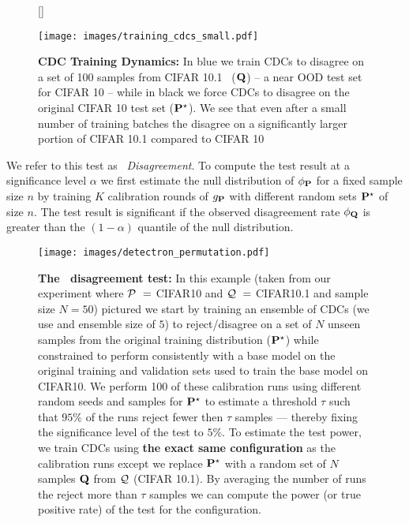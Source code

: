 \begin{figure}[!htb]
    [\FBwidth]
    {\caption{\footnotesize \textbf{CDC Training Dynamics:} In blue we train CDCs to disagree on a set of 100 samples from CIFAR 10.1~\citep{cifar101} ($\mathbf{Q}$) -- a near OOD test set for CIFAR 10 -- while in black
    we force CDCs to disagree on the original CIFAR 10 test set ($\mathbf{P}^\star$).
    We see that even after a small number of training batches the disagree on a significantly larger portion of CIFAR 10.1 compared to CIFAR 10}
    \label{fig:harmfulshift}}
    {\texttt{[image: images/training\_cdcs\_small.pdf]}}
\end{figure}

\noindent
We refer to this test as \textit{\method\ Disagreement}.
To compute the test result at a significance level $\alpha$ we first estimate the null distribution of $\phi_{\mathbf{P}}$ for a fixed sample size $n$ by training $K$ calibration rounds of $g_{\mathbf{P}}$ with different random sets $\mathbf{P}^\star$ of size $n$.
The test result is significant if the observed disagreement rate $\phi_{\mathbf{Q}}$ is greater than the $(1-\alpha)$ quantile of the null distribution.

\begin{figure}[!htb]
    \centering
    \texttt{[image: images/detectron\_permutation.pdf]}
    \caption{\textbf{The \method\ disagreement test:} In this example (taken from our experiment where $\Pc\ =\ $CIFAR10 and $\mathcal{Q}\ =\ $CIFAR10.1 and sample size $N=50$) pictured we start by
    training an ensemble of CDCs (we use and ensemble size of $5$) to reject/disagree on a set of $N$ unseen samples from the original training distribution ($\mathbf{P}^\star$) while constrained to perform consistently with a base model on the original training and validation sets used to train the base model on CIFAR10. We perform 100 of these calibration runs using different random seeds and samples for $\mathbf{P}^\star$ to estimate a threshold $\tau$ such that $95\%$ of the runs reject fewer then $\tau$ samples --- thereby fixing the significance level of the test to $5\%$. To estimate the test power, we train CDCs using \textbf{the exact same configuration} as the calibration runs except we replace $\mathbf{P}^\star$ with a random set of $N$ samples $\mathbf{Q}$ from $\mathcal{Q}$ (CIFAR 10.1). By averaging the number of runs the reject more than $\tau$ samples we can compute the power (or true positive rate) of the test for the configuration.}
    \label{fig:detectron_permutation}
\end{figure}

